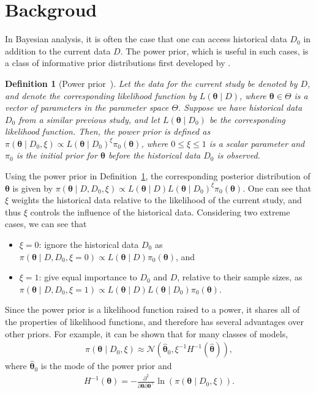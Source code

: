 \documentclass[12pt]{article}
\newtheorem{definition}{Definition}
\begin{document}
\section{Backgroud}
\label{sec:background}
In Bayesian analysis, it is often the case that one can access historical data $D_0$ in addition to the current data $D$.
The power prior, which is useful in such cases, is a class of informative prior distributions first developed by \citet{ibrahim2000power}.
\begin{definition}[Power prior~\citep{ibrahim2000power}]
    \label{def:power_prior}
    Let the data for the current study be denoted by $D$, and denote the corresponding likelihood function by $L(\bm{\theta} \mid D)$, where $\bm{\theta} \in \Theta$ is a vector of parameters in the parameter space $\Theta$.
    Suppose we have historical data $D_0$ from a similar previous study, and let $L(\bm{\theta} \mid D_0)$ be the corresponding likelihood function.
    Then, the power prior is defined as $\pi(\bm{\theta} \mid D_0, \xi) \propto L(\bm{\theta} \mid D_0)^{\xi}\pi_0(\bm{\theta})$, where $0 \leq \xi \leq 1$ is a scalar parameter and $\pi_0$ is the initial prior for $\bm{\theta}$ before the historical data $D_0$ is observed.
\end{definition}
Using the power prior in Definition~\ref{def:power_prior}, the corresponding posterior distribution of $\bm{\theta}$ is given by $\pi(\bm{\theta} \mid D, D_0, \xi) \propto L(\bm{\theta} \mid D)L(\bm{\theta} \mid D_0)^{\xi}\pi_0(\bm{\theta})$.
One can see that $\xi$ weights the historical data relative to the likelihood of the current study, and thus $\xi$ controls the influence of the historical data.
Considering two extreme cases, we can see that
\begin{itemize}
    \item $\xi = 0$: ignore the historical data $D_0$ as $\pi(\bm{\theta} \mid D, D_0, \xi = 0) \propto L(\bm{\theta} \mid D)\pi_0(\bm{\theta})$, and
    \item $\xi = 1$: give equal importance to $D_0$ and $D$, relative to their sample sizes, as $\pi(\bm{\theta} \mid D, D_0, \xi = 1) \propto L(\bm{\theta} \mid D)L(\bm{\theta} \mid D_0)\pi_0(\bm{\theta})$.
\end{itemize}

Since the power prior is a likelihood function raised to a power, it shares all of the properties of likelihood functions, and therefore has several advantages over other priors.
For example, it can be shown that for many classes of models,
\begin{align*}
    \pi(\bm{\theta} \mid D_0, \xi) \approx \mathcal{N}\left(\hat{\bm{\theta}}_0, \xi^{-1}H^{-1}(\hat{\bm{\theta}})\right),
\end{align*}
where $\hat{\bm{\theta}}_0$ is the mode of the power prior and
\begin{align*}
    H^{-1}(\bm{\theta}) = -\frac{\partial^2}{\partial\bm{\theta}\partial\bm{\theta}^\top}\ln\left(\pi(\bm{\theta} \mid D_0, \xi)\right).
\end{align*}
\end{document}
